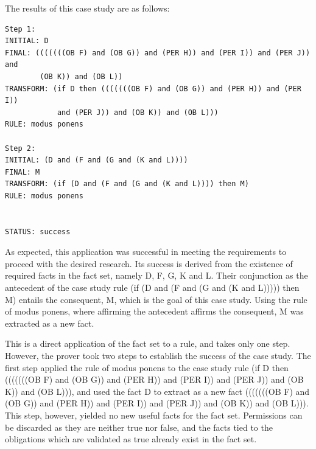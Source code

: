 \documentclass{l4proj}
\begin{document}
The results of this case study are as follows: 
\begin{verbatim}
Step 1: 
INITIAL: D
FINAL: (((((((OB F) and (OB G)) and (PER H)) and (PER I)) and (PER J)) and
        (OB K)) and (OB L))
TRANSFORM: (if D then (((((((OB F) and (OB G)) and (PER H)) and (PER I)) 
            and (PER J)) and (OB K)) and (OB L)))
RULE: modus ponens

Step 2: 
INITIAL: (D and (F and (G and (K and L))))
FINAL: M
TRANSFORM: (if (D and (F and (G and (K and L)))) then M)
RULE: modus ponens


STATUS: success
\end{verbatim}

As expected, this application was successful in meeting the requirements to proceed with the desired research. Its success is derived from the existence of required facts in the fact set, namely D, F, G, K and L. Their conjunction as the antecedent of the case study rule (if (D and (F and (G and (K and L))))) then M) entails the consequent, M, which is the goal of this case study. Using the rule of modus ponens, where affirming the antecedent affirms the consequent, M was extracted as a new fact. 

This is a direct application of the fact set to a rule, and takes only one step. However, the prover took two steps to establish the success of the case study. The first step applied the rule of modus ponens to the case study rule (if D then (((((((OB F) and (OB G)) and (PER H)) and (PER I)) and (PER J)) and (OB K)) and (OB L))), and used the fact D to extract as a new fact (((((((OB F) and (OB G)) and (PER H)) and (PER I)) and (PER J)) and (OB K)) and (OB L))). This step, however, yielded no new useful facts for the fact set. Permissions can be discarded as they are neither true nor false, and the facts tied to the obligations which are validated as true already exist in the fact set. 

\end{document}
